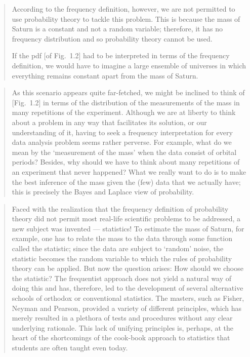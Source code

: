 \documentclass[%
oneside,                 %
final,                   %
10pt]{article}
\begin{document}

\begin{quote}
According to the frequency definition, however, we are not permitted to use probability theory to tackle this problem. This is because the mass of Saturn is a constant and not a random variable; therefore, it has no frequency distribution and so probability theory cannot be used.

If the pdf [of Fig.~1.2] had to be interpreted in terms of the frequency definition, we would have to imagine a large ensemble of universes in which everything remains constant apart from the mass of Saturn.
\end{quote}



\begin{quote}
As this scenario appears quite far-fetched, we might be inclined to think of [Fig.~1.2] in terms of the distribution of the measurements of the mass in many repetitions of the experiment. Although we are at liberty to think about a problem in any way that facilitates its solution, or our understanding of it, having to seek a frequency interpretation for every data analysis problem seems rather perverse.
For example, what do we mean by the ‘measurement of the mass’ when the data consist of orbital periods? Besides, why should we have to think about many repetitions of an experiment that never happened? What we really want to do is to make the best inference of the mass given the (few) data that we actually have; this is precisely the Bayes and Laplace view of probability.
\end{quote}



\begin{quote}
Faced with the realization that the frequency definition of probability theory did not permit most real-life scientific problems to be addressed, a new subject was invented — statistics! To estimate the mass of Saturn, for example, one has to relate the mass to the data through some function called the statistic; since the data are subject to ‘random’ noise, the statistic becomes the random variable to which the rules of probability theory can be applied. But now the question arises: How should we choose the statistic? The frequentist approach does not yield a natural way of doing this and has, therefore, led to the development of several alternative schools of orthodox or conventional statistics. The masters, such as Fisher, Neyman and Pearson, provided a variety of different principles, which has merely resulted in a plethora of tests and procedures without any clear underlying rationale. This lack of unifying principles is, perhaps, at the heart of the shortcomings of the cook-book approach to statistics that students are often taught even today.
\end{quote}
\end{document}
